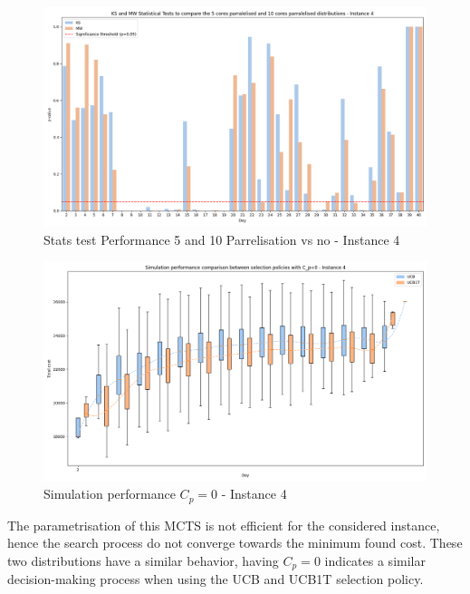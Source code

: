 \begin{figure}[!ht]
    \centering
    \includegraphics[width=\textwidth]{Figures/4 - Distribution stats tests 5P vs 10P.png}
    \caption{Stats test Performance 5 and 10 Parrelisation vs no - Instance 4}
    \label{fig:Stats test 5 VS 10 Parall}
\end{figure}



\begin{figure}[!ht]
    \centering
    \includegraphics[width=\textwidth]{Figures/4 - Simulation performance - CP=0.png}
    \caption{Simulation performance $C_p=0$ - Instance 4}
    \label{fig:sim_perf_4_cp_zero}
\end{figure}
The parametrisation of this MCTS is not efficient for the considered instance, hence the search process do not converge towards the minimum found cost. These two distributions have a similar behavior, having $C_p=0$ indicates a similar decision-making process when using the UCB and UCB1T selection policy.

